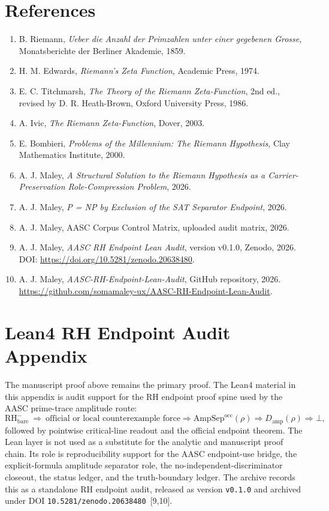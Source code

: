 \documentclass[11pt]{article}
\newcommand{\RH}{\mathrm{RH}}
\newcommand{\AmpSepOcc}{\mathrm{AmpSep}^{\mathrm{occ}}}
\newcommand{\Damp}{D_{\mathrm{amp}}}
\begin{document}
\section{References}
\begin{enumerate}
\item B. Riemann, \emph{Ueber die Anzahl der Primzahlen unter einer gegebenen Grosse}, Monatsberichte der Berliner Akademie, 1859.
\item H. M. Edwards, \emph{Riemann's Zeta Function}, Academic Press, 1974.
\item E. C. Titchmarsh, \emph{The Theory of the Riemann Zeta-Function}, 2nd ed., revised by D. R. Heath-Brown, Oxford University Press, 1986.
\item A. Ivic, \emph{The Riemann Zeta-Function}, Dover, 2003.
\item E. Bombieri, \emph{Problems of the Millennium: The Riemann Hypothesis}, Clay Mathematics Institute, 2000.
\item A. J. Maley, \emph{A Structural Solution to the Riemann Hypothesis as a Carrier-Preservation Role-Compression Problem}, 2026.
\item A. J. Maley, \emph{P = NP by Exclusion of the SAT Separator Endpoint}, 2026.
\item A. J. Maley, AASC Corpus Control Matrix, uploaded audit matrix, 2026.
\item A. J. Maley, \emph{AASC RH Endpoint Lean Audit}, version v0.1.0, Zenodo, 2026. DOI: \url{https://doi.org/10.5281/zenodo.20638480}.\label{MaleyRHEndpointLeanAuditZenodo}
\item A. J. Maley, \emph{AASC-RH-Endpoint-Lean-Audit}, GitHub repository, 2026. \url{https://github.com/somamaley-ux/AASC-RH-Endpoint-Lean-Audit}.\label{MaleyRHEndpointLeanAuditGitHub}
\end{enumerate}

\clearpage
\appendix

\clearpage
\section{Lean4 RH Endpoint Audit Appendix}\label{app:lean-rh-audit}

The manuscript proof above remains the primary proof.  The Lean4 material in this appendix is audit support for the RH endpoint proof spine used by the AASC prime-trace amplitude route:
\[
\RH^-_{\mathrm{bare}}\ \Longrightarrow\ \text{official or local counterexample force}
\Longrightarrow \AmpSepOcc(\rho)
\Longrightarrow \Damp(\rho)
\Longrightarrow \bot,
\]
followed by pointwise critical-line readout and the official endpoint theorem.  The Lean layer is not used as a substitute for the analytic and manuscript proof chain.  Its role is reproducibility support for the AASC endpoint-use bridge, the explicit-formula amplitude separator role, the no-independent-discriminator closeout, the status ledger, and the truth-boundary ledger.  The archive records this as a standalone RH endpoint audit, released as version \texttt{v0.1.0} and archived under DOI \texttt{10.5281/zenodo.20638480}~[9,10].
\end{document}
